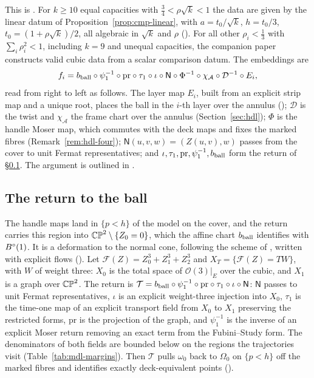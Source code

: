 This is . For $k\ge10$ equal capacities with $\frac34<\rho\sqrt k<1$ the data are
given by the linear datum of Proposition~\ref{prop:cmp-linear}, with $a=t_0/\sqrt k$, $h=t_0/3$,
$t_0=(1+\rho\sqrt k)/2$, all algebraic in $\sqrt k$ and $\rho$ (). For all other
$\rho_i<\frac13$ with $\sum_i\rho_i^2<1$, including $k=9$ and unequal capacities, the companion paper~\cite{SongHD}
constructs valid cubic data from a scalar comparison datum. The embeddings are
\[
 f_i=b_{\rm ball}\circ\psi_1^{-1}\circ\mathrm{pr}\circ\tau_1\circ\iota\circ\mathsf N\circ\Phi^{-1}\circ\chi_{\mathcal A}
 \circ\mathcal D^{-1}\circ E_i ,
\]
read from right to left as follows. The layer map $E_i$, built from an explicit strip map and a unique root, places the
ball in the $i$-th layer over the annulus (); $\mathcal D$ is the twist and
$\chi_{\mathcal A}$ the frame chart over the annulus (Section~\ref{sec:hdl}); $\Phi$ is the handle Moser map, which
commutes with the deck maps and fixes the marked fibres (Remark~\ref{rem:hdl-four}); $\mathsf N(u,v,w)=(Z(u,v),w)$
passes from the cover to unit Fermat representatives; and $\iota,\tau_1,\mathrm{pr},\psi_1^{-1},b_{\rm ball}$ form the
return of \S\ref{sec:mdl-return}. The argument
is outlined in .

\subsection{The return to the ball}\label{sec:mdl-return}

The handle maps land in $\{p<h\}$ of the model on the cover, and the return carries this region into
$\mathbb{CP}^2\setminus\{Z_0=0\}$, which the affine chart $b_{\rm ball}$ identifies with $B^{\circ}(1)$. It is a deformation to the
normal cone, following the scheme of \cite{OpenAI2026}, written with explicit flows
(). Let $\mathcal F(Z)=Z_0^3+Z_1^3+Z_2^3$ and $X_T=\{\mathcal F(Z)=TW\}$, with $W$ of
weight three: $X_0$ is the total space of $\mathcal O(3)|_E$ over the cubic, and $X_1$ is a graph over $\mathbb{CP}^2$. The
return is $\mathcal T=b_{\rm ball}\circ\psi_1^{-1}\circ\mathrm{pr}\circ\tau_1\circ\iota\circ\mathsf N$: $\mathsf N$ passes to
unit Fermat representatives, $\iota$ is an explicit weight-three injection into $X_0$, $\tau_1$ is the time-one map of
an explicit transport field from $X_0$ to $X_1$ preserving the restricted forms, $\mathrm{pr}$ is the projection of the
graph, and $\psi_1^{-1}$ is the inverse of an explicit Moser return removing an exact term from the Fubini--Study form.
The denominators of both fields are bounded below on the regions the trajectories visit (Table~\ref{tab:mdl-margins}).
Then $\mathcal T$ pulls $\omega_0$ back to $\Omega_0$ on $\{p<h\}$ off the marked fibres and identifies exactly
deck-equivalent points ().

